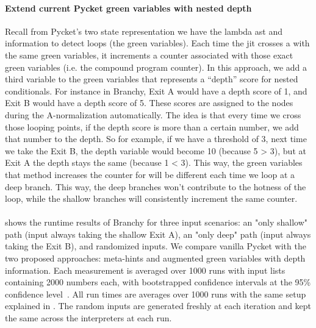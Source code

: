     \paragraph{Extend current Pycket green variables with nested  depth}%
      Recall from Pycket's two state representation we have the lambda \gls{ast} and  information to detect loops (the green variables). Each time the \gls{jit} crosses a  with the same green variables, it increments a counter associated with those exact green variables (i.e. the compound program counter). In this approach, we add a third variable to the green variables that represents a “depth” score for nested conditionals. For instance in Branchy, Exit A would have a depth score of 1, and Exit B would have a depth score of 5. These scores are assigned to the  nodes during the A-normalization automatically. The idea is that every time we cross those looping points, if the depth score is more than a certain number, we add that number to the depth. So for example, if we have a threshold of 3, next time we take the Exit B, the depth variable would become 10 (because 5 > 3), but at Exit A the depth stays the same (because 1 < 3). This way, the green variables that  method increases the counter for will be different each time we loop at a deep branch. This way, the deep branches won't contribute to the hotness of the loop, while the shallow branches will consistently increment the same counter.


    \paragraph{}%
       shows the runtime results of Branchy for three input scenarios: an "only shallow" path (input always taking the shallow Exit A), an "only deep" path (input always taking the Exit B), and randomized inputs. We compare vanilla Pycket with the two proposed approaches: meta-hints and augmented green variables with depth information. Each measurement is averaged over 1000 runs with input lists containing 2000 numbers each, with bootstrapped confidence intervals at the 95\% confidence level~\cite{davisonBootstrapMethods2013}. All run times are averages over 1000 runs with the same setup explained in . The random inputs are generated freshly at each iteration and kept the same across the interpreters at each run.


